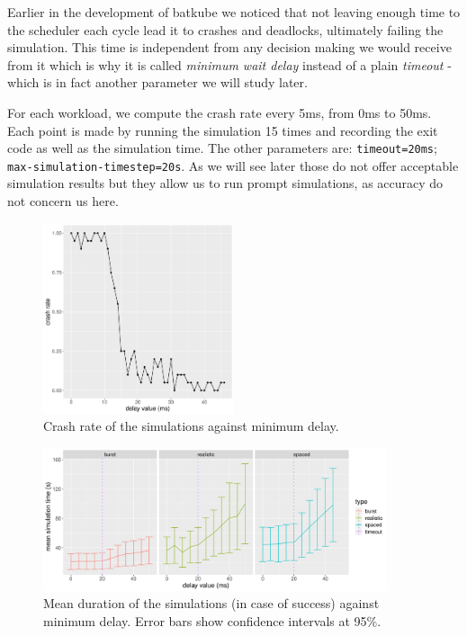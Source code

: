 Earlier in the development of batkube we noticed that not leaving enough time
to the scheduler each cycle lead it to crashes and deadlocks, ultimately
failing the simulation. This time is independent from any decision making we
would receive from it which is why it is called \textit{minimum wait delay}
instead of a plain \textit{timeout} - which is in fact another parameter we
will study later.

For each workload, we compute the crash rate every 5ms, from 0ms to 50ms. Each
point is made by running the simulation 15 times and recording the exit code as
well as the simulation time. The other parameters are: \texttt{timeout=20ms};
\texttt{max-simulation-timestep=20s}. As we will see later those do not offer
acceptable simulation results but they allow us to run prompt simulations, as
accuracy do not concern us here.\\

\begin{figure}
	\centering
	\includegraphics[width=0.5\textwidth]{imgs/min-delay_crash_old.png}
	\caption{Crash rate of the simulations against minimum delay.}
	\label{fig:min-delay_crash}
\end{figure}

\begin{figure}
	\centering
	\includegraphics[width=0.9\textwidth]{imgs/min-delay_duration.png}
	\caption{Mean duration of the simulations (in case of success) against minimum delay. Error bars show confidence intervals at 95\%.}
	\label{fig:min-delay_duration}
\end{figure}

